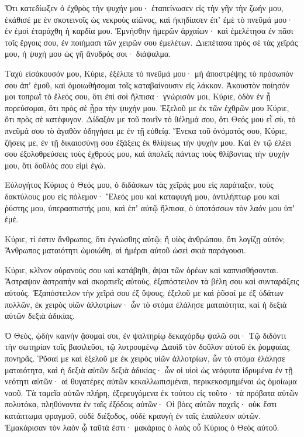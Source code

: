 \begin{spacing}{1.1}
\begin{multicols}{2}
Ὅτι κατεδίωξεν ὁ ἐχθρὸς τὴν ψυχήν μου· ἐταπείνωσεν εἰς τὴν γῆν τὴν ζωήν μου, ἐκάθισέ με ἐν σκοτεινοῖς ὡς νεκροὺς αἰῶνος,
καὶ ἠκηδίασεν ἐπʼ ἐμὲ τὸ πνεῦμά μου· ἐν ἐμοὶ ἐταράχθη ἡ καρδία μου.
Ἐμνήσθην ἡμερῶν ἀρχαίων· καὶ ἐμελέτησα ἐν πᾶσι τοῖς ἔργοις σου, ἐν ποιήμασι τῶν χειρῶν σου ἐμελέτων.
Διεπέτασα πρὸς σὲ τὰς χεῖράς μου, ἡ ψυχή μου ὡς γῆ ἄνυδρός σοι· διάψαλμα.

Ταχὺ εἰσάκουσόν μου, Κύριε, ἐξέλιπε τὸ πνεῦμά μου· μὴ ἀποστρέψῃς τὸ πρόσωπόν σου ἀπʼ ἐμοῦ, καὶ ὁμοιωθήσομαι τοῖς καταβαίνουσιν εἰς λάκκον.
Ἀκουστὸν ποίησόν μοι τοπρωῒ τὸ ἔλεός σου, ὅτι ἐπὶ σοὶ ἤλπισα· γνώρισόν μοι, Κύριε, ὁδὸν ἐν ᾗ πορεύσομαι, ὅτι πρὸς σὲ ᾖρα τὴν ψυχήν μου.
Ἐξελοῦ με ἐκ τῶν ἐχθρῶν μου Κύριε, ὅτι πρὸς σὲ κατέφυγον.
Δίδαξόν με τοῦ ποιεῖν τὸ θέλημά σου, ὅτι Θεός μου εἶ σὺ, τὸ πνεῦμά σου τὸ ἁγαθὸν ὁδηγήσει με ἐν τῇ εὐθείᾳ.
Ἕνεκα τοῦ ὀνόματός σου, Κύριε, ζήσεις με, ἐν τῇ δικαιοσύνῃ σου ἐξάξεις ἐκ θλίψεως τὴν ψυχήν μου.
Καὶ ἐν τῷ ἐλέει σου ἐξολοθρεύσεις τοὺς ἐχθρούς μου, καὶ ἀπολεῖς πάντας τοὺς θλίβοντας τὴν ψυχήν μου, ὅτι δοῦλός σου εἰμὶ ἐγώ.

Εὐλογήτος Κύριος ὁ Θεός μου, ὁ διδάσκων τὰς χεῖράς μου εἰς παράταξιν, τοὺς δακτύλους μου εἰς πόλεμον·
Ἔλεός μου καὶ καταφυγή μου, ἀντιλήπτωρ μου καὶ ῥύστης μου, ὑπερασπιστής μου, καὶ ἐπʼ αὐτῷ ἤλπισα, ὁ ὑποτάσσων τὸν λαόν μου ὑπʼ ἐμέ.

Κύριε, τί ἐστιν ἄνθρωπος, ὅτι ἐγνώσθης αὐτῷ; ἢ υἱὸς ἀνθρώπου, ὅτι λογίζῃ αὐτόν;
Ἄνθρωπος ματαιότητι ὡμοιώθη, αἱ ἡμέραι αὐτοῦ ὡσεὶ σκιὰ παράγουσι.

Κύριε, κλῖνον οὐρανούς σου καὶ κατάβηθι, ἅψαι τῶν ὀρέων καὶ καπνισθήσονται.
Ἄστραψον ἀστραπὴν καὶ σκορπιεῖς αὐτοὺς, ἐξαπόστειλον τὰ βέλη σου καὶ συνταράξεις αὐτούς.
Ἐξαπόστειλον τὴν χεῖρά σου ἐξ ὕψους, ἐξελοῦ με καὶ ῥῦσαί με ἐξ ὑδάτων πολλῶν, ἐκ χειρὸς υἱῶν ἀλλοτρίων·
ὧν τὸ στόμα ἐλάλησε ματαιότητα, καὶ ἡ δεξιὰ αὐτῶν δεξιὰ ἀδικίας.

Ὁ Θεὸς, ᾠδὴν καινὴν ᾄσομαί σοι, ἐν ψαλτηρίῳ δεκαχόρδῳ ψαλῶ σοι·
Τῷ διδόντι τὴν σωτηρίαν τοῖς βασιλεῦσι, τῷ λυτρουμένῳ Δαυὶδ τὸν δοῦλον αὐτοῦ ἐκ ῥομφαίας πονηρᾶς.
Ῥῦσαί με καὶ ἐξελοῦ με ἐκ χειρὸς υἱῶν ἀλλοτρίων, ὧν τὸ στόμα ἐλάλησε ματαιότητα, καὶ ἡ δεξιὰ αὐτῶν δεξιὰ ἀδικίας·
ὧν οἱ υἱοὶ ὡς νεόφυτα ἱδρυμένα ἐν τῇ νεότητι αὐτῶν· αἱ θυγατέρες αὐτῶν κεκαλλωπισμέναι, περικεκοσμημέναι ὡς ὁμοίωμα ναοῦ.
Τὰ ταμεῖα αὐτῶν πλήρη, ἐξερευγόμενα ἐκ τούτου εἰς τοῦτο· τὰ πρόβατα αὐτῶν πολυτόκα, πληθύνοντα ἐν ταῖς ἐξόδοις αὐτῶν·
Οἱ βόες αὐτῶν παχεῖς· οὐκ ἔστι κατάπτωμα φραγμοῦ, οὐδὲ διέξοδος, οὐδὲ κραυγὴ ἐν ταῖς ἐπαύλεσιν αὐτῶν.
Ἐμακάρισαν τὸν λαὸν ᾧ ταῦτά ἐστι· μακάριος ὁ λαὸς οὗ Κύριος ὁ Θεὸς αὐτοῦ.


\end{multicols}
\end{spacing}
